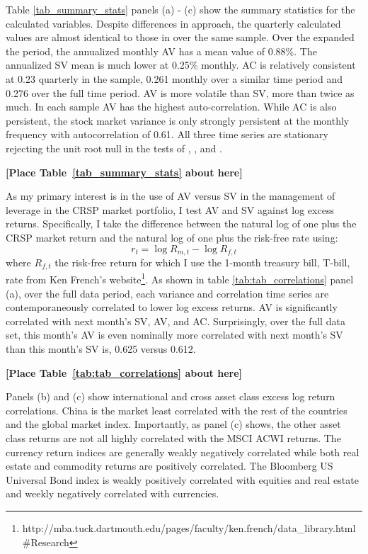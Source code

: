 Table \ref{tab_summary_stats} panels (a) - (c) show the summary statistics for the calculated variables. Despite differences in approach, the quarterly calculated values are almost identical to those in \citet{pollet_average_2010} over the same sample. Over the expanded the period, the annualized monthly AV has a mean value of 0.88\%. The annualized SV mean is much lower at 0.25\% monthly. AC is relatively consistent at 0.23 quarterly in the \cite{pollet_average_2010} sample, 0.261 monthly over a similar time period and 0.276 over the full time period. AV is more volatile than SV, more than twice as much. In each sample AV has the highest auto-correlation. While AC is also persistent, the stock market variance is only strongly persistent at the monthly frequency with autocorrelation of 0.61. All three time series are stationary rejecting the unit root null in the tests of \citet{dickey_distribution_1979}, \citet{Ng2001}, and \citet{ers1996}. 
\bigskip
\centerline{\bf [Place Table~\ref{tab_summary_stats} about here]}
\bigskip

As my primary interest is in the use of AV versus SV in the management of leverage in the CRSP market portfolio, I test AV and SV against log excess returns.
Specifically, I take the difference between the natural log of one plus the CRSP market return and the natural log of one plus the risk-free rate using:
\begin{equation}
	r_{t} = \log R_{m,t} - \log R_{f,t} 
\end{equation}
where $R_{f,t}$ the risk-free return for which I use the 1-month treasury bill, T-bill, rate from Ken French's website\footnote{http://mba.tuck.dartmouth.edu/pages/faculty/ken.french/data\_library.html\#Research}. As shown in table \ref{tab:tab_correlations} panel (a), over the full data period, each variance and correlation time series are contemporaneously correlated to lower log excess returns. AV is significantly correlated with next month's SV, AV, and AC. Surprisingly, over the full data set, this month's AV is even nominally more correlated with next month's SV than this month's SV is, 0.625 versus 0.612.%

\bigskip
\centerline{\bf [Place Table~\ref{tab:tab_correlations} about here]}
\bigskip

Panels (b) and (c) show international and cross asset class excess log return correlations. China is the market least correlated with the rest of the countries and the global market index. Importantly, as panel (c) shows, the other asset class returns are not all highly correlated with the MSCI ACWI returns. The currency return indices are generally weakly negatively correlated while both real estate and commodity returns are positively correlated. The Bloomberg US Universal Bond index is weakly positively correlated with equities and real estate and weekly negatively correlated with currencies.


